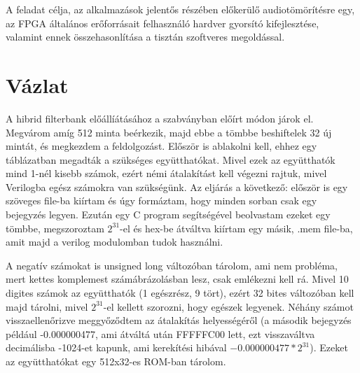 \documentclass[12pt, a4paper]{article}
\begin{document}
A feladat célja, az alkalmazások jelentős részében előkerülő audiotömörítésre egy, az FPGA általános erőforrásait felhasználó hardver gyorsító kifejlesztése, valamint ennek összehasonlítása a tisztán szoftveres megoldással.

\newpage
\tableofcontents
\newpage

\section{Vázlat}
A hibrid filterbank előállíátásához a szabványban előírt módon járok el. Megvárom amíg 512 minta beérkezik, majd ebbe a tömbbe beshiftelek 32 új mintát, és megkezdem a feldolgozást.
Először is ablakolni kell, ehhez egy táblázatban megadták a szükséges együtthatókat. Mivel ezek az együtthatók mind 1-nél kisebb számok, ezért némi átalakítást kell végezni rajtuk, mivel Verilogba egész számokra van szükségünk. 
Az eljárás a következő: először is egy szöveges file-ba kiírtam és úgy formáztam, hogy minden sorban csak egy bejegyzés legyen.
Ezután egy C program segítségével beolvastam ezeket egy tömbbe, megszoroztam $2^{31}$-el és hex-be átváltva kiírtam egy másik, .mem file-ba, amit majd a verilog modulomban tudok használni.

A negatív számokat is unsigned long változóban tárolom, ami nem probléma, mert kettes komplemest számábrázolásban lesz, csak emlékezni kell rá.
Mivel 10 digites számok az együtthatók (1 egészrész, 9 tört), ezért 32 bites változóban kell majd tárolni, mivel $2^{31}$-el kellett szorozni, hogy egészek legyenek.
Néhány számot visszaellenőrizve meggyőződtem az átalakítás helyességéről (a második bejegyzés például -0.000000477, ami átváltá után FFFFFC00 lett, ezt visszaváltva decimálisba -1024-et kapunk, ami kerekítési hibával $-0.000000477 * 2^{31}$).
Ezeket az együtthatókat egy 512x32-es ROM-ban tárolom.
\end{document}
